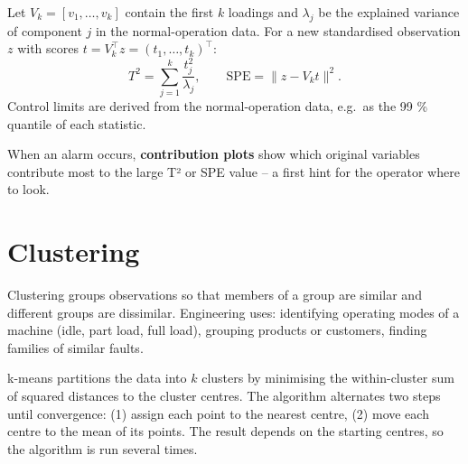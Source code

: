 \documentclass[
  letterpaper,
  DIV=11,
  numbers=noendperiod]{scrreprt}
\begin{document}
\begin{tcolorbox}[enhanced jigsaw, left=2mm, title=\textcolor{quarto-callout-note-color}{\faInfo}\hspace{0.5em}{Definition: Hotelling's T² and SPE}, opacityback=0, breakable, rightrule=.15mm, arc=.35mm, toptitle=1mm, colbacktitle=quarto-callout-note-color!10!white, opacitybacktitle=0.6, coltitle=black, colframe=quarto-callout-note-color-frame, bottomrule=.15mm, leftrule=.75mm, bottomtitle=1mm, titlerule=0mm, toprule=.15mm, colback=white]

Let \(V_k = [v_1, \dots, v_k]\) contain the first \(k\) loadings and
\(\lambda_j\) be the explained variance of component \(j\) in the
normal-operation data. For a new standardised observation \(z\) with
scores \(t = V_k^\top z = (t_1, \dots, t_k)^\top\):
\[T^2 = \sum_{j=1}^k \frac{t_j^2}{\lambda_j}, \qquad \text{SPE} = \|z - V_k t\|^2 .\]
Control limits are derived from the normal-operation data, e.g.~as the
99 \% quantile of each statistic.

\end{tcolorbox}

When an alarm occurs, \textbf{contribution plots} show which original
variables contribute most to the large T² or SPE value -- a first hint
for the operator where to look.

\section{Clustering}\label{clustering}

Clustering groups observations so that members of a group are similar
and different groups are dissimilar. Engineering uses: identifying
operating modes of a machine (idle, part load, full load), grouping
products or customers, finding families of similar faults.

\begin{tcolorbox}[enhanced jigsaw, left=2mm, title=\textcolor{quarto-callout-note-color}{\faInfo}\hspace{0.5em}{Definition: k-means}, opacityback=0, breakable, rightrule=.15mm, arc=.35mm, toptitle=1mm, colbacktitle=quarto-callout-note-color!10!white, opacitybacktitle=0.6, coltitle=black, colframe=quarto-callout-note-color-frame, bottomrule=.15mm, leftrule=.75mm, bottomtitle=1mm, titlerule=0mm, toprule=.15mm, colback=white]

k-means partitions the data into \(k\) clusters by minimising the
within-cluster sum of squared distances to the cluster centres. The
algorithm alternates two steps until convergence: (1) assign each point
to the nearest centre, (2) move each centre to the mean of its points.
The result depends on the starting centres, so the algorithm is run
several times.

\end{tcolorbox}
\end{document}
